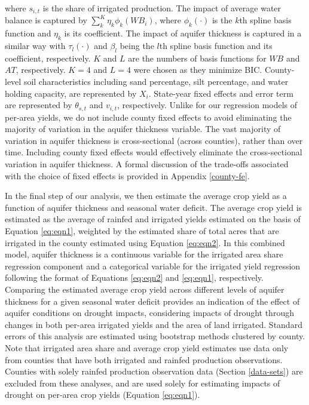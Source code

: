\documentclass[
]{article}
\begin{document}
where \(s_{i,t}\) is the share of irrigated production. The impact of average water balance is captured by \(\sum_{k}^K \eta_{k}\phi_{k}(WB_{i})\), where \(\phi_{k}(\cdot)\) is the \(k\)th spline basis function and \(\eta_{k}\) is its coefficient. The impact of aquifer thickness is captured in a similar way with \(\tau_{l}(\cdot)\) and \(\beta_{l}\) being the \(l\)th spline basis function and its coefficient, respectively. $K$ and $L$ are the numbers of basis functions for $WB$ and $AT$, respectively. $K = 4$ and $L = 4$ were chosen as they minimize BIC. County-level soil characteristics including sand percentage, silt percentage, and water holding capacity, are represented by \(X_i\). State-year fixed effects and error term are represented by \(\theta_{s,t}\) and \(v_{i,t}\), respectively. Unlike for our regression models of per-area yields, we do not include county fixed effects to avoid eliminating the majority of variation in the aquifer thickness variable. The vast majority of variation in aquifer thickness is cross-sectional (across counties), rather than over time. Including county fixed effects would effectively eliminate the cross-sectional variation in aquifer thickness. A formal discussion of the trade-offs associated with the choice of fixed effects is provided in Appendix \ref{county-fe}.

In the final step of our analysis, we then estimate the average crop yield as a function of aquifer thickness and seasonal water deficit. The average crop yield is estimated as the average of rainfed and irrigated yields estimated on the basis of Equation \eqref{eq:eqn1}, weighted by the estimated share of total acres that are irrigated in the county estimated using Equation \eqref{eq:eqn2}. In this combined model, aquifer thickness is a continuous variable for the irrigated area share regression component and a categorical variable for the irrigated yield regression following the format of Equations \eqref{eq:eqn2} and \eqref{eq:eqn1}, respectively. Comparing the estimated average crop yield across different levels of aquifer thickness for a given seasonal water deficit provides an indication of the effect of aquifer conditions on drought impacts, considering impacts of drought through changes in both per-area irrigated yields and the area of land irrigated. Standard errors of this analysis are estimated using bootstrap methods clustered by county. Note that irrigated area share and average crop yield estimates use  data only from counties that have both irrigated and rainfed production observations. Counties with solely rainfed production observation data (Section \ref{data-sets}) are excluded from these analyses, and are used solely for estimating impacts of drought on per-area crop yields (Equation \ref{eq:eqn1}).
\end{document}
